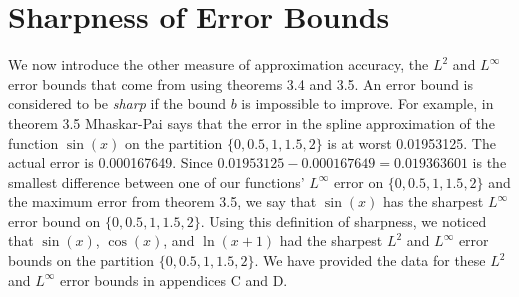 \section{Sharpness of Error Bounds}
We now introduce the other measure of approximation accuracy, the $L^2$ and $L^{\infty}$ error bounds that come from using theorems 3.4 and 3.5. An error bound is considered to be \emph{sharp} if the bound $b$ is impossible to improve.
For example, in theorem 3.5 Mhaskar-Pai says that the error in the spline approximation of the function $\sin(x)$ on the partition $\{0,0.5,1,1.5,2\}$ is at worst 0.01953125. The actual error is 0.000167649. Since $0.01953125-0.000167649 = 0.019363601$ is the smallest difference between one of our functions' $L^{\infty}$ error on $\{0,0.5,1,1.5,2\}$ and the maximum error from theorem 3.5, we say that $\sin(x)$ has the sharpest $L^{\infty}$ error bound on $\{0,0.5,1,1.5,2\}$. Using this definition of sharpness, we noticed that $\sin(x)$, $\cos(x)$, and $\ln(x+1)$ had the sharpest $L^2$ and $L^{\infty}$ error bounds on the partition $\{0,0.5,1,1.5,2\}$. We have provided the data for these $L^2$ and $L^{\infty}$ error bounds in appendices C and D.
